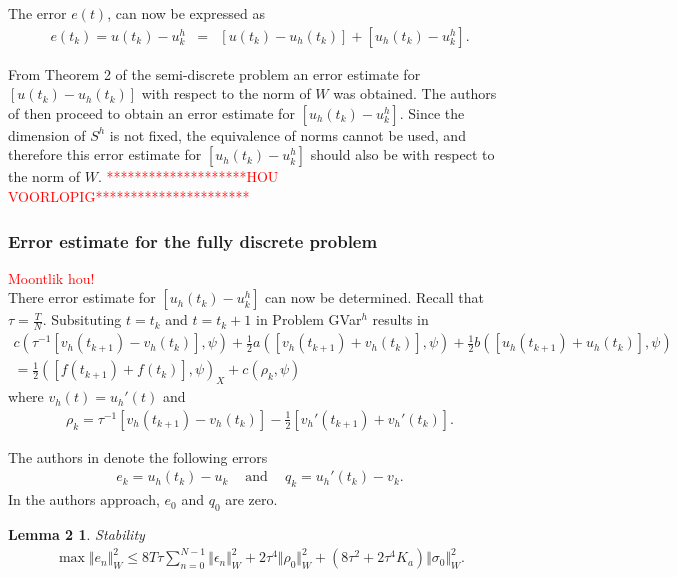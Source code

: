\documentclass[../../main.tex]{subfiles}
\begin{document}
The error $e(t)$, can now be expressed as
\begin{eqnarray}
	e(t_k) = u(t_k) - u^h_k & = & [u(t_k)-u_h(t_k)] + [u_h(t_k) - u^h_k]. \label{error_ek}
\end{eqnarray}

From Theorem 2 of the semi-discrete problem an error estimate for
$[u(t_k)-u_h(t_k)]$ with respect to the norm of $W$ was obtained. The authors
of \cite{BV13} then proceed to obtain an error estimate for $[u_h(t_k) -
			u^h_k]$. Since the dimension of $S^h$ is not fixed, the equivalence of norms
cannot be used, and therefore this error estimate for $[u_h(t_k) - u^h_k]$
should also be with respect to the norm of $W$.
\textcolor{red}{********************HOU VOORLOPIG**********************}

\subsubsection{Error estimate for the fully discrete problem}

\textcolor{red}{Moontlik hou!}\\
There error estimate for $[u_h(t_k) - u^h_k]$ can now be determined. Recall that $\tau = \frac{T}{N}$. Subsituting $t = t_k$ and $t = t_k+1$ in Problem GVar$^h$ results in
\begin{eqnarray*}
	c( \tau^{-1}[v_{h}(t_{k+1})-v_{h}(t_{k})], \psi)+\frac{1}{2}a([v_{h}(t_{k+1})+v_{h}(t_{k})], \psi)+\frac{1}{2}b([u_{h}(t_{k+1})+u_{h}(t_{k})], \psi) \\
	=\frac{1}{2}([f(t_{k+1})+f(t_{k})], \psi)_{X}+c(\rho_{k}, \psi)
\end{eqnarray*}
where $v_{h}(t)=u_{h}'(t)$ and
\begin{eqnarray*}
	\rho_{k}=\tau^{-1}[v_{h}(t_{k+1})-v_{h}(t_{k})]-\frac{1}{2}[v_{h}'(t_{k+1})+v_{h}'(t_{k})].
\end{eqnarray*}

The authors in \cite{BV13} denote the following errors
\begin{eqnarray*}
	e_{k}=u_{h}(t_{k})-u_{k} \ \ \ \ \textrm{ and } \ \ \ \ q_{k}=u_{h}'(t_{k})-v_{k}.
\end{eqnarray*} In the authors approach, $e_0$ and $q_0$ are zero.

\newtheorem*{DC_Lem3}{Lemma 2}
\begin{DC_Lem3}
	Stability
	\begin{eqnarray*}
		\max\Vert e_{n}\Vert_{W}^{2}\leq 8T\tau\sum_{n=0}^{N-1}\Vert\epsilon_{n}\Vert_{W}^{2}+2\tau^{4}\Vert\rho_{0}\Vert_{W}^{2}+(8\tau^{2}+2\tau^{4}K_{a})\Vert\sigma_{0}\Vert_{W}^{2}.
	\end{eqnarray*}
\end{DC_Lem3}
\end{document}
